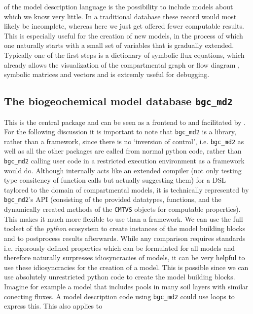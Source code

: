of the  model description language is the possibility to include
models about which we know very little. In a traditional database these
record would most likely be incomplete, whereas here we just get offered
fewer computable results.  
This is especially useful for the creation of new
models, in the process of which one naturally starts with a small set of
variables that is gradually extended.
Typically one of the first steps is a dictionary of symbolic flux equations, which already allows the visualization
of the compartmental graph or flow diagram , symbolic matrices and vectors and is extremly useful for debugging.



\subsection{The biogeochemical model database \texttt{bgc\_md2}} This is the
central package and can be seen as a frontend to \CompartmentalSystems and
\LAPM facilitated by \ComputabilityGraphs.  For the following discussion it is
important to note that \texttt{bgc\_md2} is a library, rather than a framework,
since there is no `inversion of control', i.e. \texttt{bgc\_md2} as well as all
the other packages are called from normal python code, rather than
\texttt{bgc\_md2} calling user code in a restricted execution environment as a
framework would do.  Although internally \ComputabilityGraphs acts like an
extended  compiler  (not only testing type consitency of function calls but
actually suggesting them) for a DSL taylored to the domain of compartmental
models, it is technically represented by \texttt{bgc\_md2}'s API (consisting of
the provided datatypes, functions, and the dynamically created methods of the
\texttt{CMTVS} objects for computable properties).  This makes it much more
flexible to use than a framework. We can use the full toolset of the
\emph{python} ecosystem to create instances of the model building blocks and to
postprocess results afterwards.  While any comparison requires standards i.e.
rigorously defined properties which can be formulated for all models and
therefore naturally surpresses idiosyncracies of models, it can be very helpful
to use these idiosyncracies for the creation of a model.  This is possible
since we can use absolutely unrestricted python code to create the model
building blocks.  Imagine for example a model that includes pools in many soil
layers with similar conecting fluxes. A model description code using
\texttt{bgc\_md2} could use loops to express this.  This also applies to
